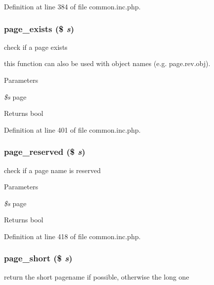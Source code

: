 Definition at line 384 of file common.inc.php.

\hypertarget{common_8inc_8php_aa71868111dd5b8af98df9cc9c968e523}{
\subsubsection[{page\_\-exists}]{\setlength{\rightskip}{0pt plus 5cm}page\_\-exists (\$ {\em s})}}
\label{common_8inc_8php_aa71868111dd5b8af98df9cc9c968e523}
check if a page exists

this function can also be used with object names (e.g. page.rev.obj). 
\begin{DoxyParams}{Parameters}
\item[{\em \$s}]page \end{DoxyParams}
\begin{DoxyReturn}{Returns}
bool 
\end{DoxyReturn}


Definition at line 401 of file common.inc.php.

\hypertarget{common_8inc_8php_a75a714d369e1abc7ee1a15ca74c98124}{
\subsubsection[{page\_\-reserved}]{\setlength{\rightskip}{0pt plus 5cm}page\_\-reserved (\$ {\em s})}}
\label{common_8inc_8php_a75a714d369e1abc7ee1a15ca74c98124}
check if a page name is reserved


\begin{DoxyParams}{Parameters}
\item[{\em \$s}]page \end{DoxyParams}
\begin{DoxyReturn}{Returns}
bool 
\end{DoxyReturn}


Definition at line 418 of file common.inc.php.

\hypertarget{common_8inc_8php_ada968adfb989aa09adaf29867208f1ab}{
\subsubsection[{page\_\-short}]{\setlength{\rightskip}{0pt plus 5cm}page\_\-short (\$ {\em s})}}
\label{common_8inc_8php_ada968adfb989aa09adaf29867208f1ab}
return the short pagename if possible, otherwise the long one


